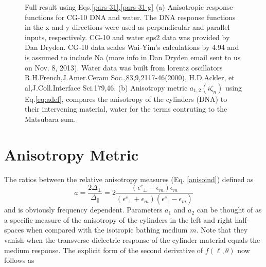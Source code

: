 \documentclass[onecolumn,letterpaper,amsmath,amssymb,floatfix,aps,superscriptaddress]{revtex4}
\begin{document}
\begin{figure}[t!]
\begin{center}
\begin{minipage}[b]{0.40\textwidth}
\end{minipage}
\caption{Full result using Eqs.\ref{pars-31},\ref{pars-31-g} (a) Anisotropic response functions for CG-10 DNA and water. The DNA response functions in the x and y directions were used as perpendicular and parallel inputs, respectively.  CG-10 and water eps2 data was provided by Dan Dryden. CG-10 data scales Wai-Yim's calculations by 4.94 and is assumed to include Na (more info in Dan Dryden email sent to us on Nov. 8, 2013).  Water data was built from lorentz oscillators R.H.French,J.Amer.Ceram Soc.,83,9,2117-46(2000), H.D.Ackler, et al,J.Coll.Interface Sci.179,46.
(b) Anisotropy metric $a_{1,2}(i\zeta_n)$ using Eq.\ref{eq:adef}, compares the anisotropy of the  cylinders (DNA) to their intervening material, water for the terms contruting to the Matsubara sum.}
\label{eiz290}
\end{center}
\end{figure} 

\section{Anisotropy Metric}
The ratios between the relative anisotropy measures (Eq. \ref{anisoind}) defined as 
\begin{equation}
a = \frac{2 \Delta_{\perp}}{\Delta_{\parallel}} = 2 \frac{({\epsilon^{c}}_{\perp}-\epsilon_{m}) \epsilon_{m}}{({\epsilon^{c}}_{\perp}+\epsilon_{m}) ({\epsilon^{c}}_{\parallel}-\epsilon_{m})}
\label{eq:adef}
\end{equation}
and is obviously frequency dependent. Parameters $a_1$ and $a_2$ can be thought of as a specific measure of the anisotropy of the cylinders in the left and right half-spaces when 
compared with the isotropic bathing medium $m$. Note that they vanish when the transverse dielectric response of the cylinder material equals the medium response. 
The explicit form of the second derivative of $f(\ell,\theta)$ now follows as 
\end{document}
